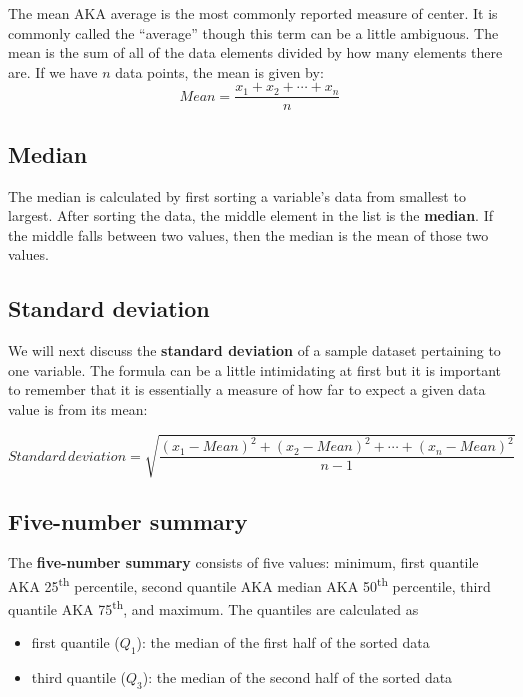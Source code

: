 \documentclass[12pt, krantz2,]{krantz}
\providecommand{\tightlist}{%
  \setlength{\itemsep}{0pt}\setlength{\parskip}{0pt}}
\begin{document}
The mean AKA average is the most commonly reported measure of center. It is commonly called the ``average'' though this term can be a little ambiguous. The mean is the sum of all of the data elements divided by how many elements there are. If we have \(n\) data points, the mean is given by: \[Mean = \frac{x_1 + x_2 + \cdots + x_n}{n}\]

\hypertarget{median}{%
\subsection{Median}\label{median}}

The median is calculated by first sorting a variable's data from smallest to largest. After sorting the data, the middle element in the list is the \textbf{median}. If the middle falls between two values, then the median is the mean of those two values.

\hypertarget{standard-deviation}{%
\subsection{Standard deviation}\label{standard-deviation}}

We will next discuss the \textbf{standard deviation} of a sample dataset pertaining to one variable. The formula can be a little intimidating at first but it is important to remember that it is essentially a measure of how far to expect a given data value is from its mean:

\[Standard \, deviation = \sqrt{\frac{(x_1 - Mean)^2 + (x_2 - Mean)^2 + \cdots + (x_n - Mean)^2}{n - 1}}\]

\hypertarget{five-number-summary}{%
\subsection{Five-number summary}\label{five-number-summary}}

The \textbf{five-number summary} consists of five values: minimum, first quantile AKA 25\textsuperscript{th} percentile, second quantile AKA median AKA 50\textsuperscript{th} percentile, third quantile AKA 75\textsuperscript{th}, and maximum. The quantiles are calculated as

\begin{itemize}
\tightlist
\item
  first quantile (\(Q_1\)): the median of the first half of the sorted data
\item
  third quantile (\(Q_3\)): the median of the second half of the sorted data
\end{itemize}
\end{document}
